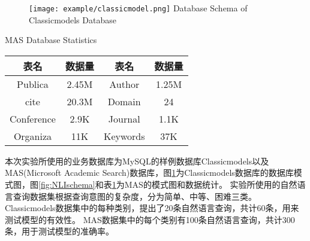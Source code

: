 \begin{figure}[!htp]
    \centering
    \texttt{[image: example/classicmodel.png]}
      {Database Schema of Classicmodels Database}
    \label{fig:NLIclassicmodel}
  \end{figure}

  \begin{table}[!hpb]
    \centering
      {MAS Database Statistics}
    \label{nli:MASsjksjtj}
    \begin{tabular}{|c|c|c|c|} 
      \hline
      表名 & 数据量 & 表名 & 数据量\\
      \hline
      Publica & 2.45M & Author & 1.25M\\
      \hline
      cite & 20.3M & Domain & 24\\
      \hline
      Conference & 2.9K & Journal & 1.1K\\
      \hline
      Organiza & 11K & Keywords & 37K\\
      \hline
    \end{tabular}
  \end{table}


本次实验所使用的业务数据库为MySQL的样例数据库Classicmodels以及MAS(Microsoft Academic Search)数据库，图\ref{fig:NLIclassicmodel}为Classicmodels数据库的数据库模式图，图\ref{fig:NLIschema}和表\ref{nli:MASsjksjtj}为MAS的模式图和数据统计。
实验所使用的自然语言查询数据集根据查询意图的复杂度，分为简单、中等、困难三类。
Classicmodels数据集中的每种类别，提出了20条自然语言查询，共计60条，用来测试模型的有效性。
MAS数据集中的每个类别有100条自然语言查询，共计300条，用于测试模型的准确率。

